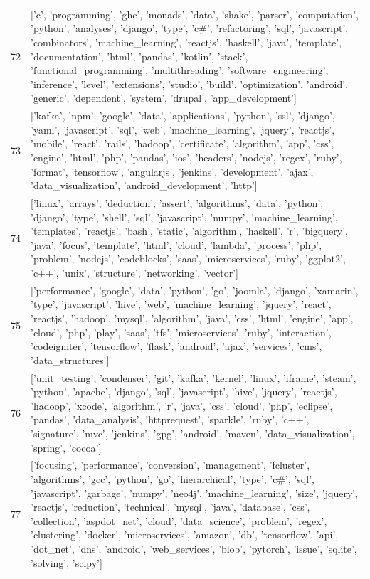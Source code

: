 \begin{center}
\begin{longtable}{|p{1.5cm}|p{12.5cm}|}
            72 & ['c', 'programming', 'ghc', 'monads', 'data', 'shake', 'parser', 'computation', 'python', 'analyses', 'django', 'type', 'c\#', 'refactoring', 'sql', 'javascript', 'combinators', 'machine\_learning', 'reactjs', 'haskell', 'java', 'template', 'documentation', 'html', 'pandas', 'kotlin', 'stack', 'functional\_programming', 'multithreading', 'software\_engineering', 'inference', 'level', 'extensions', 'studio', 'build', 'optimization', 'android', 'generic', 'dependent', 'system', 'drupal', 'app\_development']  \\ 
            73 & ['kafka', 'npm', 'google', 'data', 'applications', 'python', 'ssl', 'django', 'yaml', 'javascript', 'sql', 'web', 'machine\_learning', 'jquery', 'reactjs', 'mobile', 'react', 'rails', 'hadoop', 'certificate', 'algorithm', 'app', 'css', 'engine', 'html', 'php', 'pandas', 'ios', 'headers', 'nodejs', 'regex', 'ruby', 'format', 'tensorflow', 'angularjs', 'jenkins', 'development', 'ajax', 'data\_visualization', 'android\_development', 'http']  \\ 
            74 & ['linux', 'arrays', 'deduction', 'assert', 'algorithms', 'data', 'python', 'django', 'type', 'shell', 'sql', 'javascript', 'numpy', 'machine\_learning', 'templates', 'reactjs', 'bash', 'static', 'algorithm', 'haskell', 'r', 'bigquery', 'java', 'focus', 'template', 'html', 'cloud', 'lambda', 'process', 'php', 'problem', 'nodejs', 'codeblocks', 'saas', 'microservices', 'ruby', 'ggplot2', 'c++', 'unix', 'structure', 'networking', 'vector']  \\ 
            75 & ['performance', 'google', 'data', 'python', 'go', 'joomla', 'django', 'xamarin', 'type', 'javascript', 'hive', 'web', 'machine\_learning', 'jquery', 'react', 'reactjs', 'hadoop', 'mysql', 'algorithm', 'java', 'css', 'html', 'engine', 'app', 'cloud', 'php', 'play', 'saas', 'tfs', 'microservices', 'ruby', 'interaction', 'codeigniter', 'tensorflow', 'flask', 'android', 'ajax', 'services', 'cms', 'data\_structures']  \\ 
            76 & ['unit\_testing', 'condenser', 'git', 'kafka', 'kernel', 'linux', 'iframe', 'steam', 'python', 'apache', 'django', 'sql', 'javascript', 'hive', 'jquery', 'reactjs', 'hadoop', 'xcode', 'algorithm', 'r', 'java', 'css', 'cloud', 'php', 'eclipse', 'pandas', 'data\_analysis', 'httprequest', 'sparkle', 'ruby', 'c++', 'signature', 'mvc', 'jenkins', 'gpg', 'android', 'maven', 'data\_visualization', 'spring', 'cocoa']  \\ 
            77 & ['focusing', 'performance', 'conversion', 'management', 'fcluster', 'algorithms', 'gcc', 'python', 'go', 'hierarchical', 'type', 'c\#', 'sql', 'javascript', 'garbage', 'numpy', 'neo4j', 'machine\_learning', 'size', 'jquery', 'reactjs', 'reduction', 'technical', 'mysql', 'java', 'database', 'css', 'collection', 'aspdot\_net', 'cloud', 'data\_science', 'problem', 'regex', 'clustering', 'docker', 'microservices', 'amazon', 'db', 'tensorflow', 'api', 'dot\_net', 'dns', 'android', 'web\_services', 'blob', 'pytorch', 'issue', 'sqlite', 'solving', 'scipy']  \\ 

\end{longtable}
\end{center}
